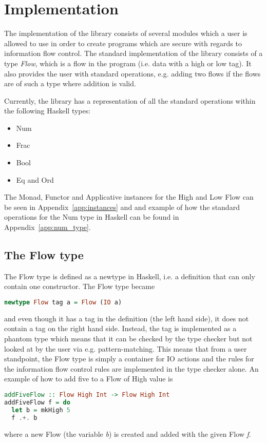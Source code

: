 \section{Implementation}
\label{chapter:implementation}
The implementation of the library consists of several modules which a user is allowed to use in order to create programs which are secure with regards to information flow control. The standard implementation of the library consists of a type \emph{Flow}, which is a flow in the program (i.e. data with a high or low tag). It also provides the user with standard operations, e.g. adding two flows if the flows are of such a type where addition is valid.

Currently, the library has a representation of all the standard operations within the following Haskell types:
\begin{itemize}
  \item Num
  \item Frac
  \item Bool
  \item Eq and Ord
\end{itemize}

The Monad, Functor and Applicative instances for the High and Low Flow can be seen in Appendix~\ref{app:instances} and and example of how the standard operations for the Num type in Haskell can be found in Appendix~\ref{app:num_type}.
\subsection{The Flow type}
\label{sec:flow}
The Flow type is defined as a newtype in Haskell, i.e. a definition that can only contain one constructor. The Flow type became
\begin{lstlisting}[language=Haskell, xleftmargin=.2\textwidth, xrightmargin=.2\textwidth]
newtype Flow tag a = Flow (IO a)
\end{lstlisting}
and even though it has a tag in the definition (the left hand side), it does not contain a tag on the right hand side. Instead, the tag is implemented as a phantom type\cite{haskell_phantom} which means that it can be checked by the type checker but not looked at by the user via e.g. pattern-matching. This means that from a user standpoint, the Flow type is simply a container for IO actions and the rules for the information flow control rules are implemented in the type checker alone. An example of how to add five to a Flow of High value is
\begin{lstlisting}[language=Haskell]
addFiveFlow :: Flow High Int -> Flow High Int
addFiveFlow f = do
  let b = mkHigh 5
  f .+. b
\end{lstlisting}
where a new Flow (the variable \emph{b}) is created and added with the given Flow \emph{f}.
